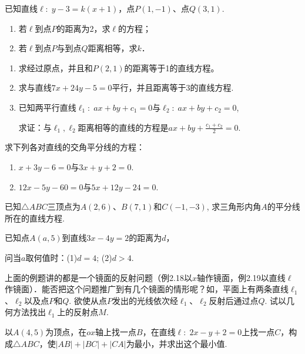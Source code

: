 \begin{enumerate}
    \item 已知直线$\ell:\; y-3=k(x+1)$，点$P(1,-1)$、点$Q(3,1)$.
\begin{enumerate}[(1)]
    \item 若$\ell$到点$P$的距离为2，求$\ell$的方程；
    \item 若$\ell$到点$P$与到点$Q$距离相等，求$k$．
\end{enumerate}
\item \begin{enumerate}[(1)]
\item 求经过原点，并且和$P(2,1)$的距离等于1的直线方程。
\item 求与直线$7x+24y-5=0$平行，并且距离等于3的直线方程.
\item 已知两平行直线$\ell_1:\; ax+by+c_1=0$与$\ell_2:\; ax+by+c_2=0$,

求证：与$\ell_1,\ell_2$距离相等的直线的方程是$ax+by+\frac{c_1+c_2}{2}=0$.
\end{enumerate}

\item 
求下列各对直线的交角平分线的方程：
\begin{enumerate}[(1)]
    \item $x+3y-6=0$与$3x+y+2=0$.
    \item $12x-5y-60=0$与$5x+12y-24=0$.
\end{enumerate}

\item 已知$\triangle ABC$三顶点为$A(2,6)$、$B(7,1)$和$C(-1,-3)$, 求三角形内角$A$的平分线所在的直线方程.
\item 已知点$A(a,5)$到直线$3x-4y=2$的距离为$d$，

问当$a$取何值时：(1)$d=4$; \qquad (2)$d>4$.



\noindent
\begin{minipage}{.47\textwidth}
\item 上面的例题讲的都是一个镜面的反射问题（例2.18以$x$轴作镜面，例2.19以直线$\ell$作镜面）．能否把这个问题推广到有几个镜面的情形呢？如，平面上有两条直线$\ell_1$、$\ell_2$以及点$P$和$Q$. 欲使从点$P$发出的光线依次经$\ell_1$、$\ell_2$反射后通过点$Q$. 试以几何方法找出$\ell_1$上的反射点$M$.


\end{minipage}\hfill
\begin{minipage}{.47\textwidth}
    \centering
{}    
\end{minipage}

\item 以$A(4,5)$为顶点，在$ox$轴上找一点$B$，在直线$\ell:\; 2x-y+2=0$上找一点$C$，构成$\triangle ABC$，使$|AB|+|BC|+|CA|$为最小，并求出这个最小值.
\end{enumerate}

